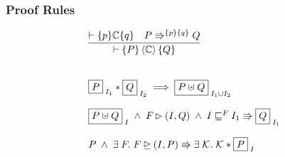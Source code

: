 \subsubsection*{Proof Rules}
%
\[
\begin{array}{l}

	\infer{
		\vdash \{ P \}
		\atomic{\mathbb{C}}
	 	\{ Q \}
	}
	{		
		\vdash\{p\} \mathbb{C} \{q\} & \repartitions{P}{Q}{p}{q} 
	}	\\\\\\




	
	\shared{P}{I_1}
	* \shared{Q}{I_2}
	\implies 
	\shared{P \sepish Q}{I_1 \cup I_2}
	\\\\
	
	\shared{P \sepish Q}{I}
	\;\land\; 
	\fence{} \fences (I, Q)
	\;\land\; 
	I  \weakenI{\fence{}} I_1 
	\Rrightarrow 
	\shared{Q}{I_1}\\\\
	
	P \;\land\; \exsts{F} F \strictfences (I, P) \Rrightarrow
	\exsts{\capAss{}} \capAss{} * \shared{P}{I}

\end{array}\\
\]
